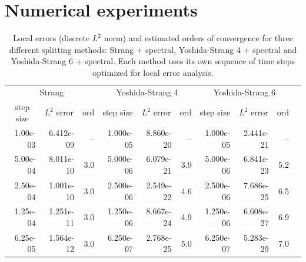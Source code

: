 \documentclass[a4paper,12pt]{article}
\begin{document}
\section{Numerical experiments}



\begin{table}[t]
\def\arraystretch{1.1}
\caption{Local errors (discrete $L^{2}$ norm) and estimated orders of convergence for three different splitting methods: Strang + spectral, Yoshida-Strang 4 + spectral and Yoshida-Strang 6 + spectral. Each method uses its own sequence of time steps optimized for local error analysis.\label{tab:errores_locales_datos}}
\begin{center}
\vspace{-3mm}
\small
\begin{tabular}{rrrrrrrrrr}
\hline
\multicolumn{3}{c}{Strang} & \multicolumn{3}{c}{Yoshida-Strang 4} & \multicolumn{3}{c}{Yoshida-Strang 6} \\
\multicolumn{1}{c}{step size} & \multicolumn{1}{c}{$L^{2}$ error} & \multicolumn{1}{c}{ord} &
\multicolumn{1}{c}{step size} & \multicolumn{1}{c}{$L^{2}$ error} & \multicolumn{1}{c}{ord} &
\multicolumn{1}{c}{step size} & \multicolumn{1}{c}{$L^{2}$ error} & \multicolumn{1}{c}{ord} \\
\hline
1.00e-03 & 6.412e-09 & --       & 1.000e-05 & 8.860e-20 & --        & 1.000e-05 & 2.441e-21 & --         \\
5.00e-04 & 8.011e-10 & 3.0      & 5.000e-06 & 6.079e-21 & 3.9      & 5.000e-06 & 6.841e-23 & 5.2       \\
2.50e-04 & 1.001e-10 & 3.0      & 2.500e-06 & 2.549e-22 & 4.6      & 2.500e-06 & 7.686e-25 & 6.5       \\
1.25e-04 & 1.251e-11 & 3.0      & 1.250e-06 & 8.667e-24 & 4.9      & 1.250e-06 & 6.608e-27 & 6.9       \\
6.25e-05 & 1.564e-12 & 3.0      & 6.250e-07 & 2.768e-25 & 5.0      & 6.250e-07 & 5.283e-29 & 7.0       \\
\hline
\end{tabular}
\vspace{-3mm}
\end{center}
\end{table}
\end{document}
